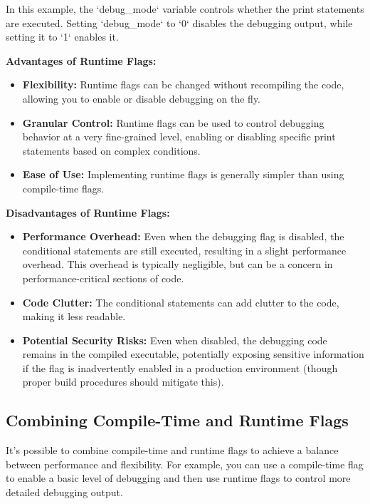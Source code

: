 \documentclass{article}
\begin{document}
{{{In this example, the `debug_mode` variable controls whether the print statements are executed. Setting `debug_mode` to `0` disables the debugging output, while setting it to `1` enables it.

\textbf{Advantages of Runtime Flags:}

\begin{itemize}
    \item \textbf{Flexibility:} Runtime flags can be changed without recompiling the code, allowing you to enable or disable debugging on the fly.
    \item \textbf{Granular Control:} Runtime flags can be used to control debugging behavior at a very fine-grained level, enabling or disabling specific print statements based on complex conditions.
    \item \textbf{Ease of Use:} Implementing runtime flags is generally simpler than using compile-time flags.
\end{itemize}

\textbf{Disadvantages of Runtime Flags:}

\begin{itemize}
    \item \textbf{Performance Overhead:} Even when the debugging flag is disabled, the conditional statements are still executed, resulting in a slight performance overhead.  This overhead is typically negligible, but can be a concern in performance-critical sections of code.
    \item \textbf{Code Clutter:} The conditional statements can add clutter to the code, making it less readable.
    \item \textbf{Potential Security Risks:}  Even when disabled, the debugging code remains in the compiled executable, potentially exposing sensitive information if the flag is inadvertently enabled in a production environment (though proper build procedures should mitigate this).
\end{itemize}

\subsection*{Combining Compile-Time and Runtime Flags}

It's possible to combine compile-time and runtime flags to achieve a balance between performance and flexibility. For example, you can use a compile-time flag to enable a basic level of debugging and then use runtime flags to control more detailed debugging output.

}}}
\end{document}
